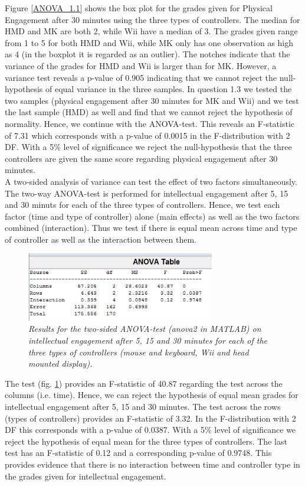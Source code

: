 Figure \ref{ANOVA_1.1} shows the box plot for the grades given for Physical Engagement after 30 minutes using the three types of controllers. The median for HMD and MK are both 2, while Wii have a median of 3. The grades given range from 1 to 5 for both HMD and Wii, while MK only has one observation as high as 4 (in the boxplot it is regarded as an outlier). The notches indicate that the variance of the grades for HMD and Wii is larger than for MK. However, a variance test reveals a p-value of 0.905 indicating that we cannot reject the null-hypothesis of equal variance in the three samples. In question 1.3 we tested the two samples (physical engagement after 30 minutes for MK and Wii) and we test the last sample (HMD) as well and find that we cannot reject the hypothesis of normality. Hence, we continue with the ANOVA-test. This reveals an F-statistic of 7.31 which corresponds with a p-value of 0.0015 in the F-distribution with 2 DF. With a 5\% level of significance we reject the null-hypothesis that the three controllers are given the same score regarding physical engagement after 30 minutes.\\

A two-sided analysis of variance can test the effect of two factors simultaneously. The two-way ANOVA-test is performed for intellectual engagement after 5, 15 and 30 minuts for each of the three types of controllers. Hence, we test each factor (time and type of controller) alone (main effects) as well as the two factors combined (interaction). Thus we test if there is equal mean across time and type of controller as well as the interaction between them.

\begin{figure}[h]
	\begin{center}
		\includegraphics[height=3cm]{fig/anova2_testvalue.png}
		\caption{\textit{{\footnotesize Results for the two-sided ANOVA-test (anova2 in MATLAB) on intellectual engagement after 5, 15 and 30 minutes for each of the three types of controllers (mouse and keyboard, Wii and head mounted display).}}}
		\label{ANOVA_2}
	\end{center}
\end{figure}

The test (fig. \ref{ANOVA_2}) provides an F-statistic of 40.87 regarding the test across the columns (i.e. time). Hence, we can reject the hypothesis of equal mean grades for intellectual engagement after 5, 15 and 30 minutes. The test across the rows (types of controllers) provides an F-statistic of 3.32. In the F-distribution with 2 DF this corresponds with a p-value of 0.0387. With a 5\% level of significance we reject the hypothesis of equal mean for the three types of controllers. The last test has an F-statistic of 0.12 and a corresponding p-value of 0.9748. This provides evidence that there is no interaction between time and controller type in the grades given for intellectual engagement.